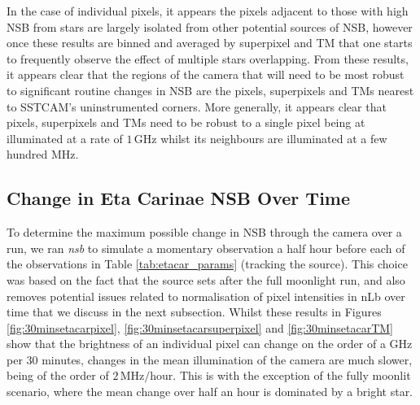 In the case of individual pixels, it appears the pixels adjacent to those with high NSB from stars are largely isolated from other potential sources of NSB, however once these results are binned and averaged by superpixel and TM that one starts to frequently observe the effect of multiple stars overlapping. From these results, it appears clear that the regions of the camera that will need to be most robust to significant routine changes in NSB are the pixels, superpixels and TMs nearest to SSTCAM's uninstrumented corners. More generally, it appears clear that pixels, superpixels and TMs need to be robust to a single pixel being at illuminated at a rate of $\mathrm{1\,GHz}$ whilst its neighbours are illuminated at a few hundred MHz.

\subsection{Change in Eta Carinae NSB Over Time}
To determine the maximum possible change in NSB through the camera over a run, we ran \textit{nsb} to simulate a momentary observation a half hour before each of the observations in Table \ref{tab:etacar_params} (tracking the source). This choice was based on the fact that the source sets after the full moonlight run, and also removes potential issues related to normalisation of pixel intensities in nLb over time that we discuss in the next subsection. Whilst these results in Figures \ref{fig:30minsetacarpixel}, \ref{fig:30minsetacarsuperpixel} and \ref{fig:30minsetacarTM} show that the brightness of an individual pixel can change on the order of a GHz per 30 minutes, changes in the mean illumination of the camera are much slower, being of the order of $\mathrm{2\,MHz/hour}$. This is with the exception of the fully moonlit scenario, where the mean change over half an hour is dominated by a bright star.

